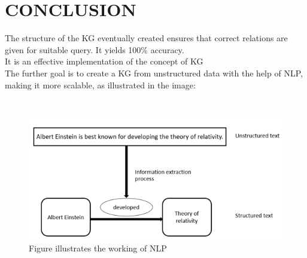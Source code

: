 \documentclass[conference]{IEEEtran}
\begin{document}
\section*{CONCLUSION}
The structure of the KG eventually created ensures that correct relations are given for suitable query. It yields 100\% accuracy.
\\
It is an effective implementation of the concept of KG
\\
The further goal is to create a KG from unstructured data with the help of NLP, making it more scalable, as illustrated in the image:

\\
\begin{figure}[htbp]
\centering
\includegraphics[width=0.8\linewidth]{nlp_img.png} %
\caption{Figure illustrates the working of NLP}
\label{fig}
\end{figure}
\end{document}
